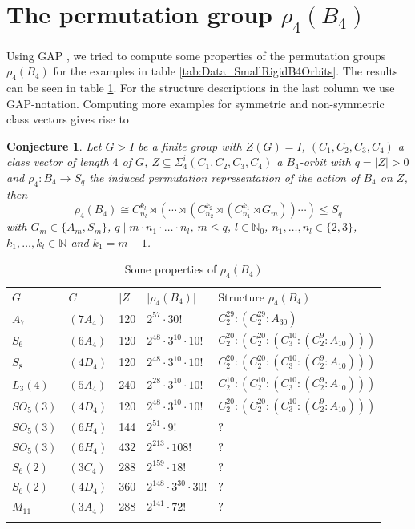 \documentclass[12pt,a4paper]{article}
\newtheorem{conjecture}{Conjecture}[section]
\numberwithin{equation}{section}
\numberwithin{table}{section}
\begin{document}
\section{The permutation group $\rho_4(B_4)$}\label{SectionTheStructureOfThePermutationGroupRho4B4}

Using GAP \cite{RefGAP}, we tried to compute some properties of the permutation groups $\rho_4(B_4)$ for the
examples in table \ref{tab:Data_SmallRigidB4Orbits}. The results can be seen in table \ref{tab:Data_SmallRigidB4OrbitsAction}.
For the structure descriptions in the last column we use GAP-notation.
Computing more examples for symmetric and non-symmetric class vectors gives rise to
%
\begin{conjecture}
\label{StructureOfRho4B4}
Let $G > I$ be a finite group with $Z(G)=I$, $(C_1,C_2,C_3,C_4)$ a class vector of length $4$ of $G$,
$Z \subseteq \Sigma^i_4(C_1,C_2,C_3,C_4)$ a $B_4$-orbit with $q = \vert Z \vert > 0$ and
$\rho_4: B_4 \rightarrow S_q$ 
the induced permutation representation of the action of $B_4$ on $Z$, then
$$\rho_4(B_4) \cong C_{n_l}^{k_l} \rtimes (\cdots \rtimes (C_{n_2}^{k_2} 
\rtimes (C_{n_1}^{k_1} \rtimes G_m))\cdots) \leq S_q$$
with $G_m \in \{ A_m, S_m \}$, $q \mid m \cdot n_1 \cdot \dots \cdot n_l$, $m \leq q$,
$l \in \mathbb{N}_0$, $n_1, \dots, n_l \in \{ 2,3 \}$,
$k_1, \dots, k_l \in \mathbb{N}$ and $k_1 = m-1$.
\end{conjecture}
%
\begin{table}[!htbp]
\centering
\footnotesize
\captionsetup{font=footnotesize}
\caption{Some properties of $\rho_4(B_4)$}
\label{tab:Data_SmallRigidB4OrbitsAction}
\begin{tabular}{lllll}
\hline\noalign{\smallskip}
$G$ & $C$ & $ \vert Z \vert $ & $\vert \rho_4(B_4) \vert$ & Structure $\rho_4(B_4)$\\
\noalign{\smallskip}\hline\noalign{\smallskip}
$A_7$ & $(7A_4)$ & 120 & $2^{57}\cdot 30!$ & $C_2^{29} : (C_2^{29} : A_{30})$\\
$S_6$ & $(6A_4)$ & 120 & $2^{48}\cdot 3^{10}\cdot 10!$ & $C_2^{20} : (C_2^{20} : (C_3^{10} : (C_2^9 : A_{10})))$\\
$S_8$ & $(4D_4)$ & 120 & $2^{48}\cdot 3^{10}\cdot 10!$ & $C_2^{20} : (C_2^{20} : (C_3^{10} : (C_2^9 : A_{10})))$\\
$L_3(4)$ & $(5A_4)$ & 240 & $2^{28}\cdot 3^{10}\cdot 10!$ & $C_2^{10} : (C_2^{10} : (C_3^{10} : (C_2^9 : A_{10})))$\\
$SO_5(3)$ & $(4D_4)$ & 120 & $2^{48}\cdot 3^{10}\cdot 10!$ & $C_2^{20} : (C_2^{20} : (C_3^{10} : (C_2^9 : A_{10})))$\\
$SO_5(3)$ & $(6H_4)$ & 144 & $2^{51}\cdot 9!$ & $?$\\
$SO_5(3)$ & $(6H_4)$ & 432 & $2^{213}\cdot 108!$ & $?$\\
$S_6(2)$ & $(3C_4)$ & 288 & $2^{159}\cdot 18!$ & $?$\\
$S_6(2)$ & $(4D_4)$ & 360 & $2^{148}\cdot 3^{30}\cdot 30!$ & $?$\\
$M_{11}$ & $(3A_4)$ & 288 & $2^{141}\cdot 72!$ & $?$\\
\noalign{\smallskip}\hline
\end{tabular}
\end{table}
\end{document}

